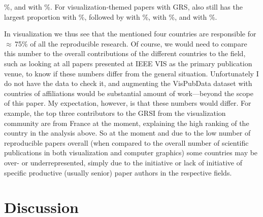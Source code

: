 \documentclass[conference]{vgtc}                     %
\begin{document}
\GrsiCountryPieChartOverallSeniorNoThreePercentage{}\%, and \GrsiCountryPieChartOverallSeniorNoFourName{} with \GrsiCountryPieChartOverallSeniorNoFourPercentage{}\%. For visualization-themed papers with GRS, \GrsiCountryPieChartVisSeniorNoOneName{} also still has the largest proportion with \GrsiCountryPieChartVisSeniorNoOnePercentage{}\%, followed by \GrsiCountryPieChartVisSeniorNoTwoName{} with \GrsiCountryPieChartVisSeniorNoTwoPercentage{}\%, \GrsiCountryPieChartVisSeniorNoThreeName{} with \GrsiCountryPieChartVisSeniorNoThreePercentage{}\%, and \GrsiCountryPieChartVisSeniorNoFourName{} with \GrsiCountryPieChartVisSeniorNoFourPercentage{}\%.

In visualization we thus see that the mentioned four countries are responsible for $\approx$\,75\% of all the reproducible research. Of course, we would need to compare this number to the overall contributions of the different countries to the field, such as looking at all papers presented at IEEE VIS as the primary publication venue, to know if these numbers differ from the general situation. Unfortunately I do not have the data to check it, and augmenting the VisPubData dataset \cite{Isenberg:2017:VMC} with countries of affiliations would be substantial amount of work---be\-yond the scope of this paper. My expectation, however, is that these numbers would differ. For example, the top three contributors to the GRSI from the visualization community are from France at the moment, explaining the high ranking of the country in the analysis above. So at the moment and due to the low number of reproducible papers overall (when compared to the overall number of scientific publications in both visualization and computer graphics) some countries may be over- or underrepresented, simply due to the initiative or lack of initiative of specific productive (usually senior) paper authors in the respective fields.

\section{Discussion}
\label{sec:discussion}
\end{document}
